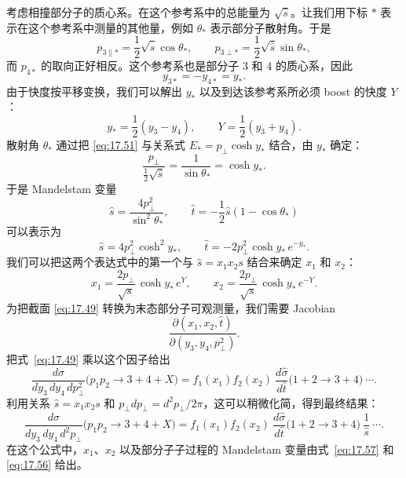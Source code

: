考虑相撞部分子的质心系。在这个参考系中的总能量为 $\sqrt{\hat{s}}$。让我们用下标 $*$ 表示在这个参考系中测量的其他量，例如 $\theta_*$ 表示部分子散射角。于是
\begin{equation}
  p_{3\parallel*} = \frac{1}{2}\sqrt{\hat{s}}\cos\theta_*,\qquad
  p_{3\perp*} = \frac{1}{2}\sqrt{\hat{s}}\sin\theta_* ,
  \label{eq:17.51}
\end{equation}
而 $p_{4*}$ 的取向正好相反。这个参考系也是部分子 3 和 4 的质心系，因此
\begin{equation}
  y_{3*} = -y_{4*} = y_* .
  \label{eq:17.52}
\end{equation}
由于快度按平移变换，我们可以解出 $y_*$ 以及到达该参考系所必须 boost 的快度 $Y$：
\begin{equation}
  y_* = \frac{1}{2}(y_3 - y_4),\qquad
  Y = \frac{1}{2}(y_3 + y_4) .
  \label{eq:17.53}
\end{equation}
散射角 $\theta_*$ 通过把 \eqref{eq:17.51} 与关系式 $E_* = p_\perp\cosh y_*$ 结合，由 $y_*$ 确定：
\begin{equation}
  \frac{p_\perp}{\frac{1}{2}\sqrt{\hat{s}}} = \frac{1}{\sin\theta_*}
  = \cosh y_* .
  \label{eq:17.54}
\end{equation}
于是 Mandelstam 变量
\begin{equation}
  \hat{s} = \frac{4p_\perp^2}{\sin^2\theta_*},\qquad
  \hat{t} = -\frac{1}{2}\hat{s}(1-\cos\theta_*)
  \label{eq:17.55}
\end{equation}
可以表示为
\begin{equation}
  \hat{s} = 4p_\perp^2\cosh^2 y_*,\qquad
  \hat{t} = -2p_\perp^2\cosh y_*\,e^{-y_*} .
  \label{eq:17.56}
\end{equation}
我们可以把这两个表达式中的第一个与 $\hat{s} = x_1x_2s$ 结合来确定 $x_1$ 和 $x_2$：
\begin{equation}
  x_1 = \frac{2p_\perp}{\sqrt{s}}\,\cosh y_*\,e^{Y},\qquad
  x_2 = \frac{2p_\perp}{\sqrt{s}}\,\cosh y_*\,e^{-Y} .
  \label{eq:17.57}
\end{equation}
为把截面 \eqref{eq:17.49} 转换为末态部分子可观测量，我们需要 Jacobian
\begin{equation}
  \frac{\partial(x_1,x_2,\hat{t})}{\partial(y_3,y_4,p_\perp^2)} .
  \label{eq:17.58}
\end{equation}
把式~\eqref{eq:17.49} 乘以这个因子给出
\begin{equation}
  \frac{d\sigma}{dy_3\,dy_4\,dp_\perp^2}\bigl( p_1p_2 \to 3+4+X \bigr)
  = f_1(x_1)f_2(x_2)\ \frac{d\hat{\sigma}}{d\hat{t}}\bigl( 1+2 \to 3+4
    \bigr)\ \cdots .
  \label{eq:17.59}
\end{equation}
利用关系 $\hat{s} = x_1x_2s$ 和 $p_\perp dp_\perp = d^2p_\perp/2\pi$，这可以稍微化简，得到最终结果：
\begin{equation}
  \frac{d\sigma}{dy_3\,dy_4\,d^2p_\perp}\bigl( p_1p_2 \to 3+4+X \bigr)
  = f_1(x_1)f_2(x_2)\ \frac{d\hat{\sigma}}{d\hat{t}}\bigl( 1+2 \to 3+4
    \bigr)\ \frac{1}{\hat{s}}\ \cdots .
  \label{eq:17.60}
\end{equation}
在这个公式中，$x_1$、$x_2$ 以及部分子子过程的 Mandelstam 变量由式~\eqref{eq:17.57} 和 \eqref{eq:17.56} 给出。

